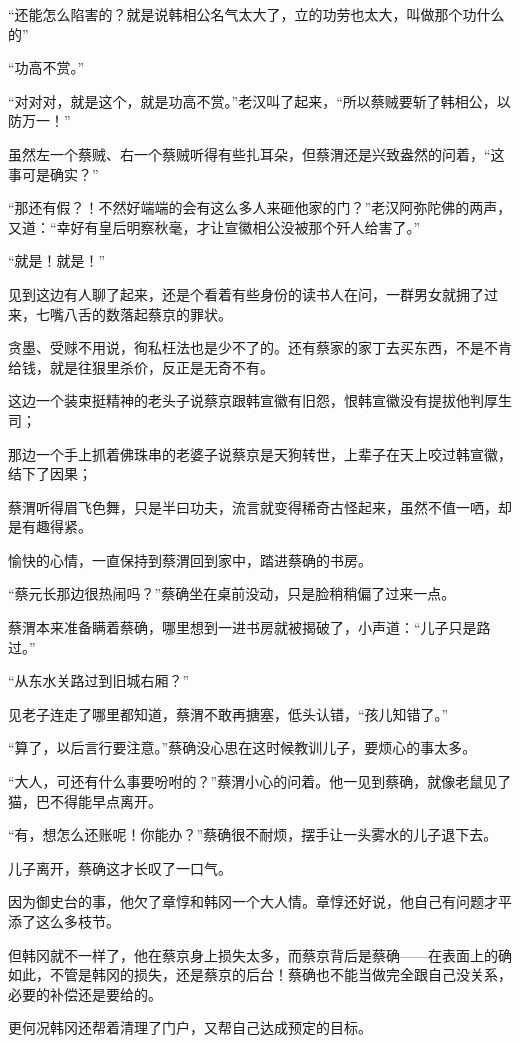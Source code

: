 “还能怎么陷害的？就是说韩相公名气太大了，立的功劳也太大，叫做那个功什么的”

“功高不赏。”

“对对对，就是这个，就是功高不赏。”老汉叫了起来，“所以蔡贼要斩了韩相公，以防万一！”

虽然左一个蔡贼、右一个蔡贼听得有些扎耳朵，但蔡渭还是兴致盎然的问着，“这事可是确实？”

“那还有假？！不然好端端的会有这么多人来砸他家的门？”老汉阿弥陀佛的两声，又道：“幸好有皇后明察秋毫，才让宣徽相公没被那个歼人给害了。”

“就是！就是！”

见到这边有人聊了起来，还是个看着有些身份的读书人在问，一群男女就拥了过来，七嘴八舌的数落起蔡京的罪状。

贪墨、受赇不用说，徇私枉法也是少不了的。还有蔡家的家丁去买东西，不是不肯给钱，就是往狠里杀价，反正是无奇不有。

这边一个装束挺精神的老头子说蔡京跟韩宣徽有旧怨，恨韩宣徽没有提拔他判厚生司；

那边一个手上抓着佛珠串的老婆子说蔡京是天狗转世，上辈子在天上咬过韩宣徽，结下了因果；

蔡渭听得眉飞色舞，只是半曰功夫，流言就变得稀奇古怪起来，虽然不值一哂，却是有趣得紧。

愉快的心情，一直保持到蔡渭回到家中，踏进蔡确的书房。

“蔡元长那边很热闹吗？”蔡确坐在桌前没动，只是脸稍稍偏了过来一点。

蔡渭本来准备瞒着蔡确，哪里想到一进书房就被揭破了，小声道：“儿子只是路过。”

“从东水关路过到旧城右厢？”

见老子连走了哪里都知道，蔡渭不敢再搪塞，低头认错，“孩儿知错了。”

“算了，以后言行要注意。”蔡确没心思在这时候教训儿子，要烦心的事太多。

“大人，可还有什么事要吩咐的？”蔡渭小心的问着。他一见到蔡确，就像老鼠见了猫，巴不得能早点离开。

“有，想怎么还账呢！你能办？”蔡确很不耐烦，摆手让一头雾水的儿子退下去。

儿子离开，蔡确这才长叹了一口气。

因为御史台的事，他欠了章惇和韩冈一个大人情。章惇还好说，他自己有问题才平添了这么多枝节。

但韩冈就不一样了，他在蔡京身上损失太多，而蔡京背后是蔡确——在表面上的确如此，不管是韩冈的损失，还是蔡京的后台！蔡确也不能当做完全跟自己没关系，必要的补偿还是要给的。

更何况韩冈还帮着清理了门户，又帮自己达成预定的目标。

